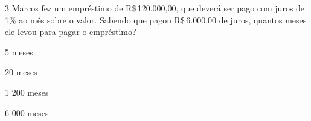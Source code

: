 









\num{3} Marcos fez um empréstimo de R\$\,120.000,00, que deverá ser pago com
juros de 1\% ao mês sobre o valor. Sabendo que pagou R\$\,6.000,00 de
juros, quantos meses ele levou para pagar o empréstimo?

\begin{escolha}
\item 5 meses
\item 20 meses
\item 1 200 meses
\item 6 000 meses
\end{escolha}








